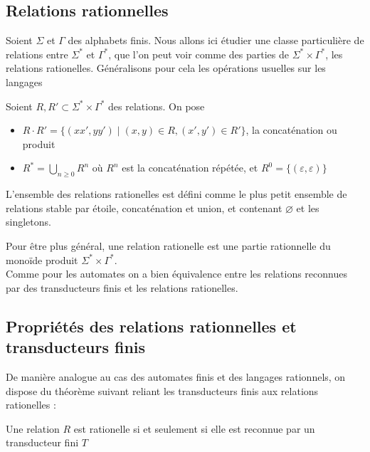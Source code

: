 \documentclass{scrartcl}
\begin{document}
\begin{flushleft}
\vspace*{2cm}

\subsection{Relations rationnelles}

Soient $\Sigma$ et $\Gamma$ des alphabets finis. Nous allons ici étudier une classe particulière
de relations entre $\Sigma^*$ et $\Gamma^*$, que l'on peut voir comme des parties de $\Sigma^* \times \Gamma^*$,
les relations rationelles. Généralisons pour cela les opérations usuelles sur les langages 

\begin{define}
    Soient $R, R' \subset \Sigma^* \times \Gamma^*$ des relations. On pose
    \begin{itemize}
        \item $R \cdot R' = \{ (xx', yy') \mid (x, y) \in R, (x', y') \in R' \}$, la concaténation ou produit
        \item $\displaystyle R^* = \bigcup_{n \geq 0} R^n$ où $R^n$ est la concaténation répétée, et $R^0 =
        \{ (\varepsilon, \varepsilon) \}$
    \end{itemize}
\end{define}

\begin{define}
    L'ensemble des relations rationelles est défini comme le plus petit ensemble de relations stable par étoile,
    concaténation et union, et contenant $\varnothing$ et les singletons.
\end{define}

Pour être plus général, une relation rationelle est une partie rationnelle du monoïde produit
$\Sigma^* \times \Gamma^*$.\\
Comme pour les automates on a bien équivalence entre les relations reconnues par des transducteurs finis
et les relations rationelles.

\subsection{Propriétés des relations rationnelles et transducteurs finis}

De manière analogue au cas des automates finis et des langages rationnels, on dispose du théorème suivant reliant
les transducteurs finis aux relations rationelles :

\begin{theorem}
    Une relation $R$ est rationelle si et seulement si elle est reconnue par un transducteur fini $T$
\end{theorem}


\end{flushleft}
\end{document}
